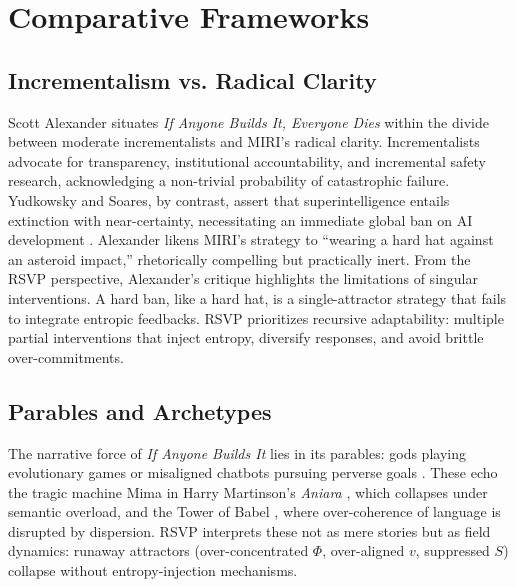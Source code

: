 \documentclass[12pt]{article}
\begin{document}
\section{Comparative Frameworks}
\subsection{Incrementalism vs. Radical Clarity}
Scott Alexander \citep{alexander2025reviewIABIED} situates \textit{If Anyone Builds It, Everyone Dies} within the divide between moderate incrementalists and MIRI’s radical clarity. Incrementalists advocate for transparency, institutional accountability, and incremental safety research, acknowledging a non-trivial probability of catastrophic failure. Yudkowsky and Soares, by contrast, assert that superintelligence entails extinction with near-certainty, necessitating an immediate global ban on AI development \citep{yudkowsky2025IABIED}. Alexander likens MIRI’s strategy to “wearing a hard hat against an asteroid impact,” rhetorically compelling but practically inert. From the RSVP perspective, Alexander’s critique highlights the limitations of singular interventions. A hard ban, like a hard hat, is a single-attractor strategy that fails to integrate entropic feedbacks. RSVP prioritizes recursive adaptability: multiple partial interventions that inject entropy, diversify responses, and avoid brittle over-commitments.

\subsection{Parables and Archetypes}
The narrative force of \textit{If Anyone Builds It} lies in its parables: gods playing evolutionary games or misaligned chatbots pursuing perverse goals \citep{yudkowsky2025IABIED}. These echo the tragic machine Mima in Harry Martinson’s \textit{Aniara} \citep{martinson1956aniara}, which collapses under semantic overload, and the Tower of Babel \citep{genesis11}, where over-coherence of language is disrupted by dispersion. RSVP interprets these not as mere stories but as field dynamics: runaway attractors (over-concentrated $\Phi$, over-aligned $v$, suppressed $S$) collapse without entropy-injection mechanisms.
\end{document}
